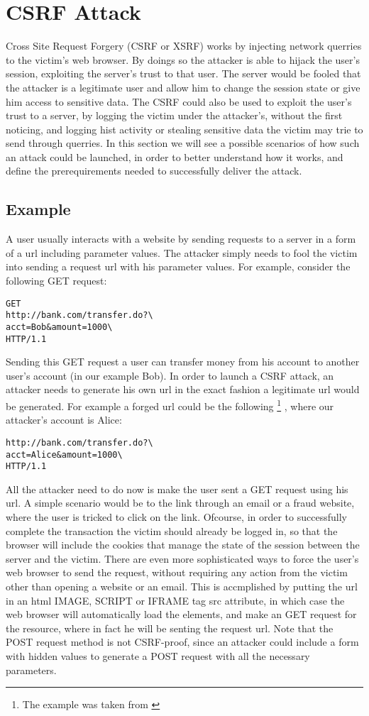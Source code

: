 \label{CSRFattack}
\section{CSRF Attack}


Cross Site Request Forgery (CSRF or XSRF) works by injecting network querries to the victim's web browser.  By doings so
the attacker is able to hijack the user's session, exploiting the server's trust to that user.  The server would be fooled
that the attacker is a legitimate user and allow him to change the session state or give him access to sensitive data.
The CSRF could also be used to exploit the user's trust to a server, by logging the victim under the attacker's, without 
the first noticing, and logging hist activity or stealing sensitive data the victim may trie to send through querries.
In this section we will see a possible scenarios of how such an attack could be launched, in order to better understand
how it works, and define the prerequirements needed to successfully deliver the attack. 

\subsection{Example}
A user usually interacts with a website by sending requests to a server in a form of a url including parameter values.  
The attacker simply needs to fool the victim into sending a request url with his parameter values.  For example, consider
the following GET request: 
\begin{lstlisting}
GET 
http://bank.com/transfer.do?\
acct=Bob&amount=1000\ 
HTTP/1.1
\end{lstlisting}
Sending this GET request a user can transfer money from his account to another user's account (in our example Bob).
In order to launch a CSRF attack, an attacker needs to generate his own url in the exact fashion a legitimate url
would be generated. For example a forged url could be the following
\footnote{The example was taken from \cite{website:owasp-csrf}}
, where our attacker's account is Alice:
\begin{lstlisting}
http://bank.com/transfer.do?\
acct=Alice&amount=1000\ 
HTTP/1.1
\end{lstlisting}
All the attacker need to do now is make the user sent a GET request using his url.  A simple scenario would be to
the link through an email or a fraud website, where the user is tricked to click on the link.  Ofcourse, in order
to successfully complete the transaction the victim should already be logged in, so that the browser will include
the cookies that manage the state of the session between the server and the victim.  There are even more 
sophisticated ways to force the user's web browser to send the request, without requiring any action from the 
victim other than opening a website or an email.  This is accmplished by putting the url in an html IMAGE, SCRIPT 
or IFRAME tag src attribute, in which case the web browser will automatically load the elements, and make an GET 
request for the resource, where in fact he will be senting the request url.  Note that the POST request method
is not CSRF-proof, since an attacker could include a form with hidden values to generate a POST request with 
all the necessary parameters.

